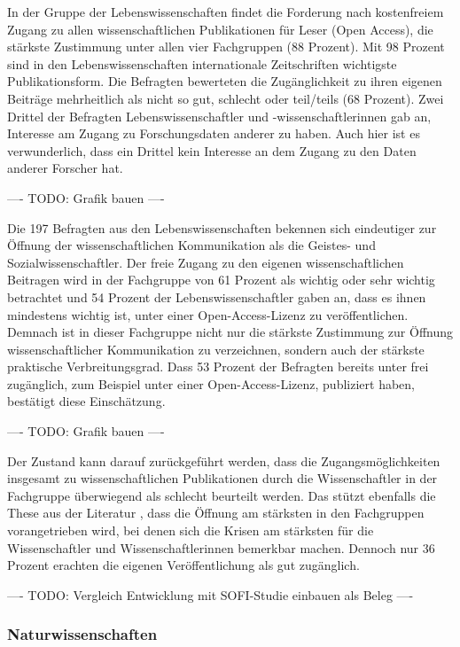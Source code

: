 In der Gruppe der Lebenswissenschaften findet die Forderung nach kostenfreiem Zugang zu allen wissenschaftlichen Publikationen für Leser (Open Access), die stärkste Zustimmung unter allen vier Fachgruppen (88 Prozent). Mit 98 Prozent sind in den Lebenswissenschaften internationale Zeitschriften wichtigste Publikationsform. Die Befragten bewerteten die Zugänglichkeit zu ihren eigenen Beiträge mehrheitlich als nicht so gut, schlecht oder teil/teils (68 Prozent). Zwei Drittel der Befragten Lebenswissenschaftler und -wissenschaftlerinnen gab an, Interesse am Zugang zu Forschungsdaten anderer zu haben. Auch hier ist es verwunderlich, dass ein Drittel kein Interesse an dem Zugang zu den Daten anderer Forscher hat.

---- TODO: Grafik bauen  ----

Die 197 Befragten aus den Lebenswissenschaften bekennen sich eindeutiger zur Öffnung der wissenschaftlichen Kommunikation als die Geistes- und Sozialwissenschaftler. Der freie Zugang zu den eigenen wissenschaftlichen Beitragen wird in der Fachgruppe von 61 Prozent als wichtig oder sehr wichtig betrachtet und 54 Prozent der Lebenswissenschaftler gaben an, dass es ihnen mindestens wichtig ist, unter einer Open-Access-Lizenz zu veröffentlichen. Demnach ist in dieser Fachgruppe nicht nur die stärkste Zustimmung zur Öffnung wissenschaftlicher Kommunikation zu verzeichnen, sondern auch der stärkste praktische Verbreitungsgrad. Dass 53 Prozent der Befragten bereits unter frei zugänglich, zum Beispiel unter einer Open-Access-Lizenz, publiziert haben, bestätigt diese Einschätzung.

---- TODO: Grafik bauen  ----

Der Zustand kann darauf zurückgeführt werden, dass die Zugangsmöglichkeiten insgesamt zu wissenschaftlichen Publikationen durch die Wissenschaftler in der Fachgruppe überwiegend als schlecht beurteilt werden. Das stützt ebenfalls die These aus der Literatur \cite{suchen}, dass die Öffnung am stärksten in den Fachgruppen vorangetrieben wird, bei denen sich die Krisen am stärksten für die Wissenschaftler und Wissenschaftlerinnen bemerkbar machen. Dennoch nur 36 Prozent erachten die eigenen Veröffentlichung als gut zugänglich.

---- TODO: Vergleich Entwicklung mit SOFI-Studie einbauen als Beleg ----

\subsubsection{Naturwissenschaften}

